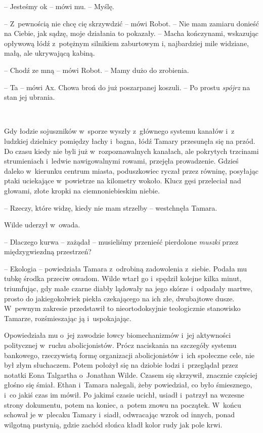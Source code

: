 \documentclass[oneside,polish,11pt,sfheadings]{mwbk}
\begin{document}
-- Jesteśmy ok -- mówi mu. -- Myślę.

-- Z~pewnością nie chcę cię skrzywdzić -- mówi Robot. -- Nie mam zamiaru
donieść na Ciebie, jak sądzę, moje działania to pokazały. -- Macha
kończynami, wskazując opływową łódź z~potężnym silnikiem zaburtowym i,
najbardziej mile widziane, małą, ale ukrywającą kabiną.

-- Chodź ze mną -- mówi Robot. -- Mamy dużo do zrobienia.

-- Ta -- mówi Ax. Chowa broń do już poszarpanej koszuli. -- Po prostu
\emph{spójrz} na stan jej ubrania.

~

Gdy łodzie sojuszników w~sporze wyszły z~głównego systemu kanałów i~z ludzkiej dzielnicy pomiędzy łachy i~bagna, łódź Tamary przesunęła się na
przód. Do czasu kiedy nie byli już w~rozpoznawalnych kanałach, ale
pokrytych trzcinami strumieniach i~ledwie nawigowalnymi rowami, przejęła
prowadzenie. Gdzieś daleko w~kierunku centrum miasta, poduszkowiec
ryczał przez równinę, posyłając ptaki uciekające w~powietrze na
kilometry wokoło. Klucz gęsi przeleciał nad głowami, złote kropki na
ciemnoniebieskim niebie.

-- Rzeczy, które widzę, kiedy nie mam strzelby -- westchnęła Tamara.

Wilde uderzył w~owada. 

-- Dlaczego kurwa -- zażądał -- musieliśmy przenieść
pierdolone \emph{muszki} przez międzygwiezdną przestrzeń?

-- Ekologia -- powiedziała Tamara z~odrobiną zadowolenia z~siebie. Podała
mu tubkę środka przeciw owadom. Wilde wtarł go i~spędził kolejne kilka
minut, triumfując, gdy małe czarne diabły lądowały na jego skórze i~odpadały martwe, prosto do jakiegokolwiek piekła czekającego na ich złe,
dwubajtowe dusze. W~pewnym zakresie przedstawił to nieortodoksyjnie
teologicznie stanowisko Tamarze, rozśmieszając ją i~uspokajając.

Opowiedziała mu o~jej zawodzie łowcy biomechanizmów i~jej aktywności
politycznej w~ruchu abolicjonistów. Prócz naciskania na szczegóły
systemu bankowego, rzeczywistą formę organizacji abolicjonistów i~ich
społeczne cele, nie był złym słuchaczem. Potem położył się na dziobie
łodzi i~przeglądał przez notatki Eona Talgartha o~Jonathan Wilde. Czasem
się skrzywił, znacznie częściej głośno się śmiał. Ethan i~Tamara
nalegali, żeby powiedział, co było śmiesznego, i~co jakiś czas im mówił.
Po jakimś czasie ucichł, usiadł i~patrzył na wczesne strony dokumentu,
potem na koniec, a~potem znowu na początek. W~końcu schował je w~plecaku
Tamary i~siadł, odwracając wzrok od innych, ponad wilgotną pustynią,
gdzie zachód słońca kładł kolor rudy jak pole krwi.
\end{document}
